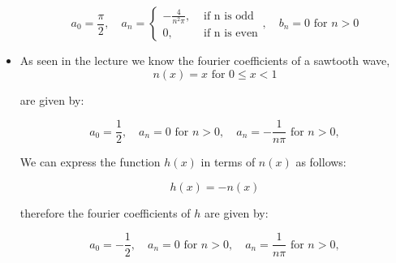 \documentclass[11pt]{article}
\begin{document}
\begin{solution}
\begin{itemize}
$$
a_0 = \frac{\pi}{2}, \quad a_n = \begin{cases}-\frac{4}{n^2\pi}, & \text { if n is odd} \\ 0, & \text{ if n is even}\end{cases}, \quad b_n = 0 \text{ for } n > 0
$$
\item As seen in the lecture we know the fourier coefficients of a sawtooth wave,
$$
n(x)=x \text { for } 0 \leq x<1
$$

are given by:

$$
a_0 = \frac{1}{2}, \quad a_n = 0 \text{ for } n > 0,  \quad a_n = -\frac{1}{n\pi} \text{ for } n > 0,
$$

We can express the function $h(x)$ in terms of $n(x)$ as follows:

$$
h(x) = -n(x)
$$

therefore the fourier coefficients of $h$ are given by:

$$
a_0 = -\frac{1}{2}, \quad a_n = 0 \text{ for } n > 0,  \quad a_n = \frac{1}{n\pi} \text{ for } n > 0,
$$
\end{itemize}
\end{solution}
\end{document}
